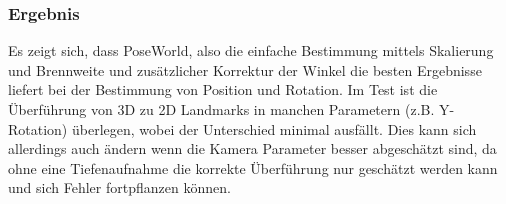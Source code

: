 \subsubsection{Ergebnis}
Es zeigt sich, dass PoseWorld, also die einfache Bestimmung mittels Skalierung und Brennweite und zusätzlicher Korrektur der Winkel die besten Ergebnisse liefert bei der Bestimmung von Position und Rotation.
\newpage
Im Test ist die Überführung von 3D zu 2D Landmarks in manchen Parametern (z.B. Y-Rotation) überlegen, wobei der Unterschied minimal ausfällt. Dies kann sich allerdings auch ändern wenn die Kamera Parameter besser abgeschätzt sind, da ohne eine Tiefenaufnahme die korrekte Überführung nur geschätzt werden kann und sich Fehler fortpflanzen können.